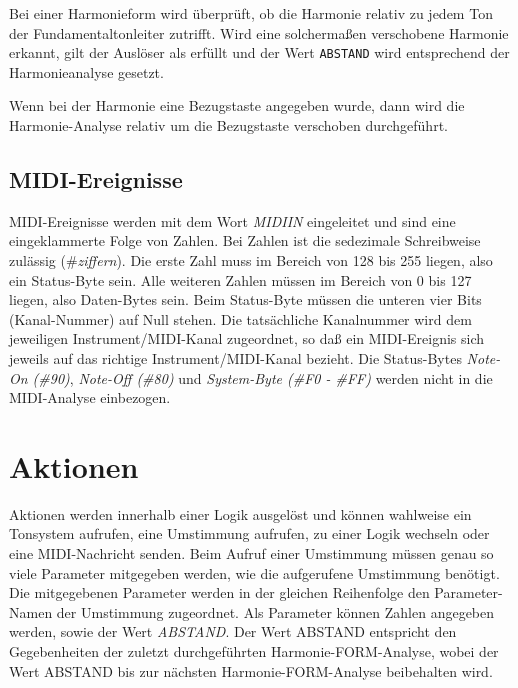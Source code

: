 Bei einer Harmonieform wird überprüft,
ob die Harmonie relativ zu jedem
Ton der Fundamentaltonleiter zutrifft. Wird eine solchermaßen
verschobene Harmonie erkannt, gilt der Auslöser als erfüllt
und der Wert \texttt{ABSTAND} wird entsprechend der Harmonieanalyse gesetzt.

Wenn bei der Harmonie eine Bezugstaste
 angegeben wurde, dann wird
die Harmonie-Analyse relativ um die Bezugstaste verschoben durchgeführt.

    

\subsection{MIDI-Ereignisse}\label{sec:midi-ereignisse}
MIDI-Ereignisse werden mit dem Wort \emph{MIDIIN}
eingeleitet und
sind eine eingeklammerte Folge von Zahlen. Bei Zahlen ist die sedezimale
Schreibweise zulässig (\#\emph{ziffern}).\index{\#}
Die erste Zahl muss im Bereich von
128 bis 255 liegen, also ein Status-Byte sein. Alle weiteren Zahlen
müssen im Bereich von 0 bis 127 liegen, also Daten-Bytes sein.
Beim Status-Byte müssen die unteren vier Bits (Kanal-Nummer) auf Null stehen.
Die tatsächliche Kanalnummer wird dem jeweiligen
Instrument/MIDI-Kanal zugeordnet,
so daß ein MIDI-Ereignis sich jeweils auf das richtige
Instrument/MIDI-Kanal bezieht.
Die Status-Bytes
 \emph{Note-On (\#90)}, \emph{Note-Off
  (\#80)} und
\emph{System-Byte
 (\#F0 - \#FF)} werden nicht in die MIDI-Analyse
einbezogen.

    

\section{Aktionen}\label{sec:aktionen}

Aktionen werden innerhalb einer Logik ausgelöst und können wahlweise
ein Tonsystem aufrufen, eine Umstimmung aufrufen,
zu einer Logik wechseln oder eine MIDI-Nachricht
senden. Beim Aufruf einer Umstimmung müssen genau so viele Parameter
mitgegeben werden, wie die aufgerufene Umstimmung benötigt. Die mitgegebenen
Parameter werden in der gleichen Reihenfolge den Parameter-Namen
der Umstimmung zugeordnet. Als Parameter können Zahlen angegeben werden,
sowie der Wert \emph{ABSTAND}.
Der Wert ABSTAND entspricht den Gegebenheiten der
zuletzt durchgeführten Harmonie-FORM-Analyse, wobei der Wert
ABSTAND bis zur nächsten Harmonie-FORM-Analyse beibehalten wird.

